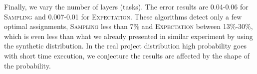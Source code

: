 \documentclass[letterpaper]{article} %
\newcommand{\sampling}{\textsc{Sampling}\xspace}
\newcommand{\expectation}{\textsc{Expectation}\xspace}
\begin{document}
Finally, we vary the number of layers (tasks).
The error results are 0.04-0.06 for \sampling and 0.007-0.01 for \expectation. These algorithms detect only a few optimal assignments, \sampling less than 7\% and \expectation between 13\%-30\%, which is even less than what we already presented in similar experiment by using the synthetic distribution. In the real project distribution high probability goes with short time execution, we conjecture the results are affected by the shape of the probability. 
\end{document}
